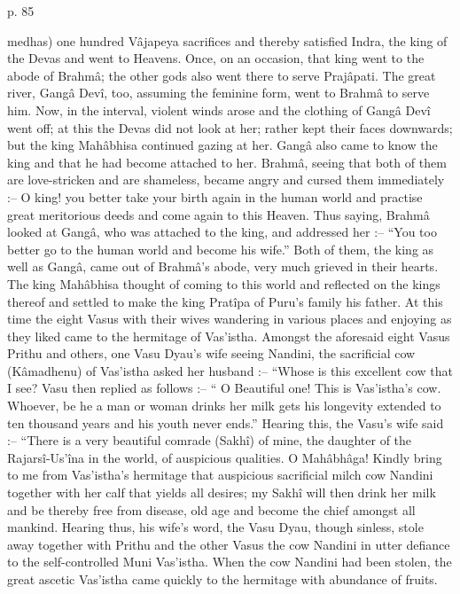  

p. 85

 

medhas) one hundred Vâjapeya sacrifices and thereby satisfied Indra, the king of the Devas and went to Heavens. Once, on an occasion, that king went to the abode of Brahmâ; the other gods also went there to serve Prajâpati. The great river, Gangâ Devî, too, assuming the feminine form, went to Brahmâ to serve him. Now, in the interval, violent winds arose and the clothing of Gangâ Devî went off; at this the Devas did not look at her; rather kept their faces downwards; but the king Mahâbhisa continued gazing at her. Gangâ also came to know the king and that he had become attached to her. Brahmâ, seeing that both of them are love-stricken and are shameless, became angry and cursed them immediately :-- O king! you better take your birth again in the human world and practise great meritorious deeds and come again to this Heaven. Thus saying, Brahmâ looked at Gangâ, who was attached to the king, and addressed her :-- “You too better go to the human world and become his wife.” Both of them, the king as well as Gangâ, came out of Brahmâ's abode, very much grieved in their hearts. The king Mahâbhisa thought of coming to this world and reflected on the kings thereof and settled to make the king Pratîpa of Puru's family his father. At this time the eight Vasus with their wives wandering in various places and enjoying as they liked came to the hermitage of Vas'istha. Amongst the aforesaid eight Vasus Prithu and others, one Vasu Dyau's wife seeing Nandini, the sacrificial cow (Kâmadhenu) of Vas'istha asked her husband :-- “Whose is this excellent cow that I see?  Vasu then replied as follows :-- “ O Beautiful one! This is Vas'istha's cow. Whoever, be he a man or woman drinks her milk gets his longevity extended to ten thousand years and his youth never ends.” Hearing this, the Vasu's wife said :-- “There is a very beautiful comrade (Sakhî) of mine, the daughter of the Rajarsî-Us'îna in the world, of auspicious qualities. O Mahâbhâga! Kindly bring to me from Vas'istha's hermitage that auspicious sacrificial milch cow Nandini together with her calf that yields all desires; my Sakhî will then drink her milk and be thereby free from disease, old age and become the chief amongst all mankind. Hearing thus, his wife's word, the Vasu Dyau, though sinless, stole away together with Prithu and the other Vasus the cow Nandini in utter defiance to the self-controlled Muni Vas'istha. When the cow Nandini had been stolen, the great ascetic Vas'istha came quickly to the hermitage with abundance of fruits.

